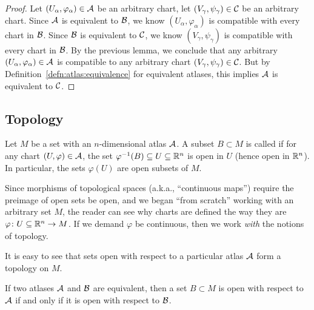 \begin{proof}
Let $(U_{\alpha},\varphi_{\alpha})\in\mathcal{A}$ be an arbitrary chart,
let $(V_{\gamma},\psi_{\gamma})\in\mathcal{C}$ be an arbitrary chart.
Since $\mathcal{A}$ is equivalent to $\mathcal{B}$, we know
$(U_{\alpha},\varphi_{\alpha})$ is compatible with every chart in $\mathcal{B}$.
Since $\mathcal{B}$ is equivalent to $\mathcal{C}$, we know
$(V_{\gamma},\psi_{\gamma})$ is compatible with every chart in $\mathcal{B}$.
By the previous lemma, we conclude that any arbitrary
$(U_{\alpha},\varphi_{\alpha})\in\mathcal{A}$ is compatible to any arbitrary
chart $(V_{\gamma},\psi_{\gamma})\in\mathcal{C}$. But by Definition~\ref{defn:atlas:equivalence} for
equivalent atlases, this implies $\mathcal{A}$ is equivalent to $\mathcal{C}$.
\end{proof}

\subsection{Topology}

\begin{definition}
Let $M$ be a set with an $n$-dimensional atlas $\mathcal{A}$. A subset
$B\subset M$
is called  if for any chart
$(U,\varphi)\in\mathcal{A}$, the set $\varphi^{-1}(B)\subseteq U\subseteq\mathbb{R}^{n}$
is open in $U$ (hence open in $\mathbb{R}^{n}$).
In particular, the sets $\varphi(U)$ are open subsets of $M$.
\end{definition}

\begin{remark}
Since morphisms of topological spaces (a.k.a., ``continuous maps'')
require the preimage of open sets be open, and we began ``from scratch''
working with an arbitrary set $M$, the reader can see why charts are
defined the way they are $\varphi\colon U\subseteq\mathbb{R}^{n}\to M$. If we
demand $\varphi$ be continuous, then we work \emph{with} the notions of
topology.
\end{remark}

\begin{remark}
It is easy to see that sets open with respect to a particular atlas
$\mathcal{A}$ form a topology on $M$.
\end{remark}

\begin{proposition}
If two atlases $\mathcal{A}$ and $\mathcal{B}$ are equivalent, then a set
$B\subset M$ is open with respect to $\mathcal{A}$ if and only if it is
open with respect to $\mathcal{B}$.
\end{proposition}

